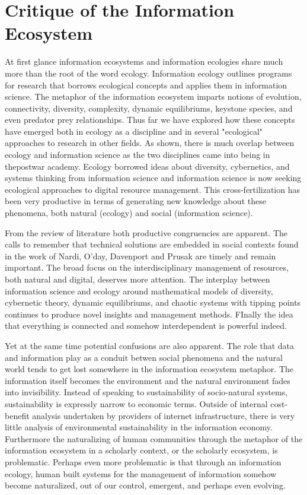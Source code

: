 \section{Critique of the Information Ecosystem}

At first glance information ecosystems and information ecologies share much more than the root of the word ecology. Information ecology outlines programs for research that borrows ecological concepts and applies them in information science.  The metaphor of the information ecosystem imparts notions of evolution, connectivity, diversity, complexity, dynamic equilibriums, keystone species, and even predator prey relationships. Thus far we have explored how these concepts have emerged both in ecology as a discipline and in several "ecological" approaches to research in other fields. As shown, there is much overlap between ecology and information science as the two disciplines came into being in thepostwar academy. Ecology borrowed ideas about diversity, cybernetics, and systems thinking from information science and information science is now seeking ecological approaches to digital resource management. This cross-fertilization has been very productive in terms of generating new knowledge about these phenomena, both natural (ecology) and social (information science). 

From the review of literature both productive congruencies are apparent. The calls to remember that technical solutions are embedded in social contexts found in the work of Nardi, O'day, Davenport and Prusak are timely and remain important. The broad focus on the interdisciplinary management of resources, both natural and digital, deserves more attention. The interplay between information science and ecology around mathematical models of diversity, cybernetic theory, dynamic equilibriums, and chaotic systems with tipping points continues to produce novel insights and management methods. FInally the idea that everything is connected and somehow interdependent is powerful indeed.

Yet at the same time potential confusions are also apparent. The role that data and information play as a conduit betwen social phenomena and the natural world tends to get lost somewhere in the information ecosystem metaphor. The information itself becomes the environment and the natural environment fades into invisibility. Instead of speaking to sustainability of socio-natural systems, sustainability is expressly narrow to economic terms. Outside of internal cost-benefit analysis undertaken by providers of internet infrastructure, there is very little analysis of environmental sustainability in the information economy. Furthermore the naturalizing of human communities through the metaphor of the information ecosystem in a scholarly context, or the scholarly ecosystem, is problematic. Perhaps even more problematic is that through an information ecology, human built systems for the management of information somehow become naturalized, out of our control, emergent, and perhaps even evolving.

